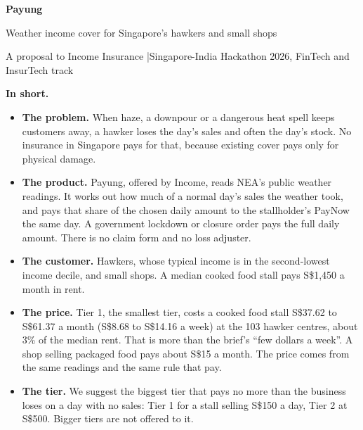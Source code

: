 \documentclass[11pt,a4paper]{article}
\newcommand{\sgd}{\textup{S\$}}
\begin{document}
\begin{center}
  {\bfseries\huge\color{ink} Payung}\par\vspace{0.3em}
  {\Large Weather income cover for Singapore's hawkers and small shops}\par\vspace{0.7em}
  {\small A proposal to Income Insurance \quad|\quad Singapore-India Hackathon 2026, FinTech and InsurTech track}\par\vspace{0.2em}{\small Team SIH-FIN-4}
\end{center}

\begin{tcolorbox}[colback=soft,colframe=accent,boxrule=0.6pt,arc=2pt,left=8pt,right=8pt,top=6pt,bottom=6pt]
\textbf{In short.}
\begin{itemize}[leftmargin=1.2em,itemsep=0.25em,topsep=0.25em]
  \item \textbf{The problem.} When haze, a downpour or a dangerous heat spell keeps customers away, a hawker loses the day's sales and often the day's stock. No insurance in Singapore pays for that, because existing cover pays only for physical damage.\cite{ps,mse-hawker}
  \item \textbf{The product.} Payung, offered by Income, reads NEA's public weather readings. It works out how much of a normal day's sales the weather took, and pays that share of the chosen daily amount to the stallholder's PayNow the same day. A government lockdown or closure order pays the full daily amount. There is no claim form and no loss adjuster.
  \item \textbf{The customer.} Hawkers, whose typical income is in the second-lowest income decile, and small shops.\cite{koh-hawker} A median cooked food stall pays \sgd 1,450 a month in rent.\cite{mse-rent}
  \item \textbf{The price.} Tier 1, the smallest tier, costs a cooked food stall \sgd 37.62 to \sgd 61.37 a month (\sgd 8.68 to \sgd 14.16 a week) at the 103 hawker centres, about 3\% of the median rent. That is more than the brief's ``few dollars a week''. A shop selling packaged food pays about \sgd 15 a month. The price comes from the same readings and the same rule that pay.
  \item \textbf{The tier.} We suggest the biggest tier that pays no more than the business loses on a day with no sales: Tier 1 for a stall selling \sgd 150 a day, Tier 2 at \sgd 500. Bigger tiers are not offered to it.

\end{itemize}
\end{tcolorbox}
\end{document}
